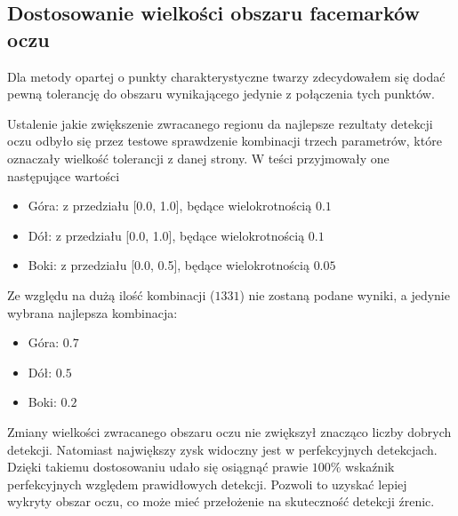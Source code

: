 \subsection{Dostosowanie wielkości obszaru facemarków oczu} \label{section:facemark_eye_size}

Dla metody opartej o punkty charakterystyczne twarzy zdecydowałem się dodać pewną tolerancję do obszaru wynikającego jedynie z połączenia tych punktów.
\par
Ustalenie jakie zwiększenie zwracanego regionu da najlepsze rezultaty detekcji oczu odbyło się przez testowe sprawdzenie kombinacji trzech parametrów, które oznaczały wielkość tolerancji z danej strony. W teści przyjmowały one następujące wartości

\begin{itemize}
    \item Góra: z przedziału [0.0, 1.0], będące wielokrotnością $0.1$
    \item Dół: z przedziału [0.0, 1.0], będące wielokrotnością $0.1$
    \item Boki: z przedziału [0.0, 0.5], będące wielokrotnością $0.05$
\end{itemize}

\par

Ze względu na dużą ilość kombinacji ($1331$) nie zostaną podane wyniki, a jedynie wybrana najlepsza kombinacja:
\begin{itemize}
    \item Góra: $0.7$
    \item Dół: $0.5$
    \item Boki: $0.2$
\end{itemize}




Zmiany wielkości zwracanego obszaru oczu nie zwiększył znacząco liczby dobrych detekcji. Natomiast największy zysk widoczny jest w perfekcyjnych detekcjach. Dzięki takiemu dostosowaniu udało się osiągnąć prawie $100\%$ wskaźnik perfekcyjnych względem prawidłowych detekcji. Pozwoli to uzyskać lepiej wykryty obszar oczu, co może mieć przełożenie na skuteczność detekcji źrenic.